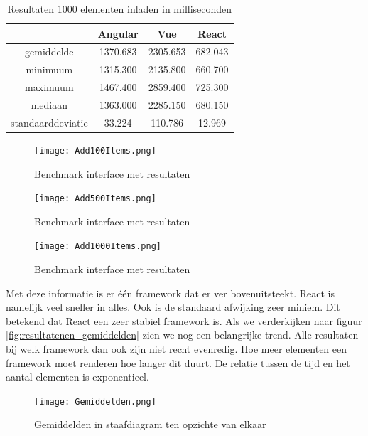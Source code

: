 \begin{table}[h]
\centering
\caption{Resultaten 1000 elementen inladen in milliseconden}
\label{table:resultaten_1000_elementen}
\begin{tabular}{|c|c|c|c|} \hline
		   						&Angular     &Vue        &React      \\ \hline
	gemiddelde			&1370.683     &2305.653  &682.043 \\ \hline
	minimuum			&1315.300    &2135.800  &660.700 \\ \hline
	maximuum			&1467.400    &2859.400  &725.300 \\ \hline
	mediaan				   &1363.000    &2285.150  &680.150 \\ \hline
	standaarddeviatie &33.224       &110.786    &12.969    \\ \hline
\end{tabular}
\end{table}

\begin{figure}[h!]
	\caption{Benchmark interface met resultaten}
	\centering
	\texttt{[image: Add100Items.png]}
	\label{fig:resultaten_100_elementen}
\end{figure}
\begin{figure}[h!]
	\caption{Benchmark interface met resultaten}
	\centering
	\texttt{[image: Add500Items.png]}
	\label{fig:resultaten_500_elementen}
\end{figure}
\begin{figure}[h!]
	\caption{Benchmark interface met resultaten}
	\centering
	\texttt{[image: Add1000Items.png]}
	\label{fig:resultaten_1000_elementen}
\end{figure}

Met deze informatie is er één framework dat er ver bovenuitsteekt. React is namelijk veel sneller in alles. Ook is de standaard afwijking zeer miniem. Dit betekend dat React een zeer stabiel framework is. Als we verderkijken naar figuur \ref{fig:resultatenen_gemiddelden} zien we nog een belangrijke trend. Alle resultaten bij welk framework dan ook zijn niet recht evenredig. Hoe meer elementen een framework moet renderen hoe langer dit duurt. De relatie tussen de tijd en het aantal elementen is exponentieel. 

\begin{figure}[h!]
	\caption{Gemiddelden in staafdiagram ten opzichte van elkaar}
	\centering
	\texttt{[image: Gemiddelden.png]}
	\label{fig:resultaten_gemiddelden}
\end{figure}







